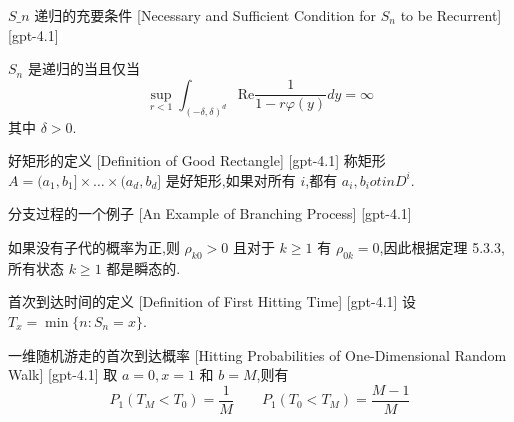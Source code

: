 \documentclass[UTF8]{ctexart}
\begin{document}
    
    
    \begin{thm}
        {$S\_n$ 递归的充要条件}
        [Necessary and Sufficient Condition for $S_n$ to be Recurrent]
        [gpt-4.1]
        
$S_n$ 是递归的当且仅当
\[
\operatorname*{sup}_{r < 1} \int_{(-\delta, \delta)^d} \mathrm{Re} \frac{1}{1 - r \varphi(y)} dy = \infty
\]
其中 $\delta > 0$.

    \end{thm}
    
    
    
    \begin{dfn}
        {好矩形的定义}
        [Definition of Good Rectangle]
        [gpt-4.1]
        称矩形 $A = ( a _ { 1 } , b _ { 1 } ] \times \ldots \times ( a _ { d } , b _ { d } ]$ 是好矩形,如果对所有 $i$,都有 $a _ { i }, b _ { i } 
otin D ^ { i }$.
    \end{dfn}
    
    
    
    \begin{xmp}
        {分支过程的一个例子}
        [An Example of Branching Process]
        [gpt-4.1]
        
如果没有子代的概率为正,则 $\rho_{k0} > 0$ 且对于 $k \geq 1$ 有 $\rho_{0k} = 0$,因此根据定理 5.3.3,所有状态 $k \geq 1$ 都是瞬态的.

    \end{xmp}
    
    
    
    \begin{dfn}
        {首次到达时间的定义}
        [Definition of First Hitting Time]
        [gpt-4.1]
        设 $T_{x} = \operatorname*{min} \{ n : S_{n} = x \}$.
    \end{dfn}
    
    
    
    \begin{thm}
        {一维随机游走的首次到达概率}
        [Hitting Probabilities of One-Dimensional Random Walk]
        [gpt-4.1]
        取 $a = 0, x = 1$ 和 $b = M$,则有
\[
P_{1}(T_{M} < T_{0}) = \frac{1}{M} \qquad P_{1}(T_{0} < T_{M}) = \frac{M-1}{M}
\]

    \end{thm}
    
\end{document}
